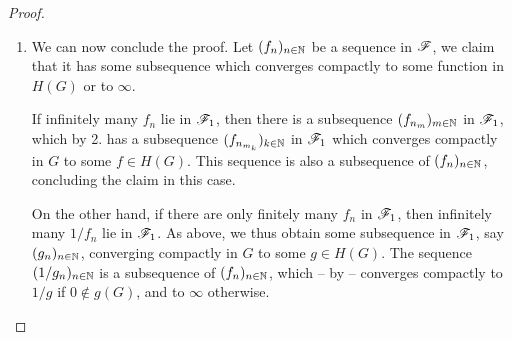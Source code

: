 \begin{proof}
\begin{enumerate}
        \item We can now conclude the proof. Let $(f_n)_{n \in \mathbb{N}}$ be a sequence in $\mathscr{F}$, we claim that it has some subsequence which converges compactly to some function in $H(G)$ or to $\infty$.
        
        If infinitely many $f_n$ lie in $\mathscr{F}_1$, then there is a subsequence $(f_{n_m})_{m \in \mathbb{N}}$ in $\mathscr{F}_1$, which by 2. has a subsequence $(f_{n_{m_k}})_{k \in \mathbb{N}}$ in $\mathscr{F}_1$ which converges compactly in $G$ to some $f \in H(G)$. This sequence is also a subsequence of $(f_n)_{n \in \mathbb{N}}$, concluding the claim in this case.
        
        On the other hand, if there are only finitely many $f_n$ in $\mathscr{F}_1$, then infinitely many $1 / f_n$ lie in $\mathscr{F}_1$. As above, we thus obtain some subsequence in $\mathscr{F}_1$, say $(g_n)_{n \in \mathbb{N}}$, converging compactly in $G$ to some $g \in H(G)$. The sequence $(1 / g_n)_{n \in \mathbb{N}}$ is a subsequence of $(f_n)_{n \in \mathbb{N}}$, which -- by  -- converges compactly to $1 / g$ if $0 \notin g(G) $, and to $\infty$ otherwise. \qedhere
    \end{enumerate}
\end{proof}